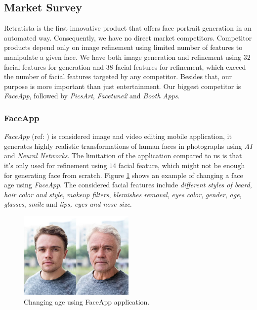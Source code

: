 \subsection{Market Survey}

Retratista is the first innovative product that offers face portrait generation in an automated way. Consequently, we have no direct market competitors. Competitor products depend only on image refinement using limited number of features to manipulate a given face. We have both image generation and refinement using $32$ facial features for generation and $38$ facial features for refinement, which exceed the number of facial features targeted by any competitor. Besides that, our purpose is more important than just entertainment. Our biggest competitor is \emph{FaceApp}, followed by \emph{PicsArt}, \emph{Facetune2} and \emph{Booth Apps}.

\subsubsection{FaceApp}
\emph{FaceApp} (ref: ) is considered image and video editing mobile application, it generates highly realistic transformations of human faces in photographs using \emph{AI} and \emph{Neural Networks}. The limitation of the application compared to us is that it's only used for refinement using $14$ facial feature, which might not be enough for generating face from scratch. Figure \ref{fig:faceApp} shows an example of changing a face age using \emph{FaceApp}. The considered facial features include \emph{different styles of beard}, \emph{hair color and style}, \emph{makeup filters}, \emph{blemishes removal}, \emph{eyes color}, \emph{gender}, \emph{age}, \emph{glasses}, \emph{smile} and \emph{lips, eyes and nose size}.

\begin{figure}[H]
    \centering
    \includegraphics[width=0.5\textwidth]{images/FaceApp.jpg}
    \caption{Changing age using FaceApp application.}
    \label{fig:faceApp}
\end{figure}

